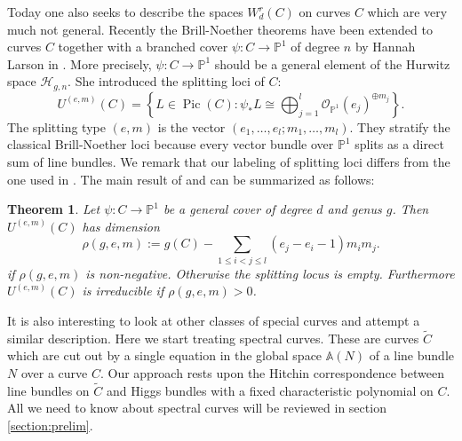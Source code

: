 \documentclass[12pt]{extarticle}
\newtheorem{theorem}{Theorem}
\theoremstyle{definition}
\numberwithin{theorem}{section}
\newcommand{\PP}{\mathbb{P}}
\newcommand{\Aff}{\mathbb{A}}
\newcommand{\OO}{\mathcal{O}}
\newcommand{\cH}{\mathcal{H}}
\newcommand{\op}{\operatorname}
\renewcommand{\tilde}{\widetilde}		%
\begin{document}
Today one also seeks to describe the spaces $W^r_d(C)$ on curves $C$ which are very much not general. Recently the Brill-Noether theorems have been extended to curves $C$ together with a branched cover $ \psi: C \to \PP^1$ of degree $n$ by Hannah Larson in \cite{Hlarson}. More precisely, $\psi: C\to \PP^1$ should be a general element of the Hurwitz space $\cH_{g,n}$. She introduced the splitting loci of $C$: 
\begin{equation*}
U^{(e,m)}(C) = \left\{ L \in \op{Pic}(C): \psi_*L \cong \bigoplus_{j=1}^l \OO_{\PP^1}(e_j)^{\oplus m_j} \right\}. 
\end{equation*}
The splitting type $(e,m)$ is the vector $(e_1,\ldots,e_l;m_1,\ldots,m_l)$.  They stratify the classical Brill-Noether loci because every vector bundle over $\PP^1$ splits as a direct sum of line bundles. We remark that our labeling of splitting loci differs from the one used in \cite{Hlarson}. The main result of \cite{Hlarson} and \cite{LLV} can be summarized as follows:
\begin{theorem}\cite[Larson, Larson, Vogt]{Hlarson,LLV}\label{thm:hurwitz_brill_noether}
Let $\psi: C \to \PP^1$ be a general cover of degree $d$ and genus $g$. Then $U^{(e,m)}(C)$ has dimension  
\begin{equation*}
\rho(g,e,m) := g(C) - \sum_{1 \leq i < j\leq l}(e_j - e_i -1 )m_im_j.
\end{equation*}
if $\rho(g,e,m)$ is non-negative. Otherwise the splitting locus is empty. Furthermore $U^{(e,m)}(C)$ is irreducible if $\rho(g,e,m) > 0$.
\end{theorem} 
It is also interesting to look at other classes of special curves  and attempt a similar description. Here we start treating spectral curves. These are curves $\tilde{C}$ which are cut out by a single equation in the global space $\Aff(N)$ of a line bundle $N$ over a curve $C$. Our approach rests upon the Hitchin correspondence between line bundles on $\tilde{C}$ and Higgs bundles with a fixed characteristic polynomial on $C$. All we need to know about spectral curves  will be reviewed in section \ref{section:prelim}. 
\end{document}

